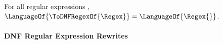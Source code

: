 \documentclass[sigplan,acmsmall]{acmart}
\begin{document}
\begin{theorem}
  \label{thm:dnfrs}
  For all regular expressions \Regex{},
  $\LanguageOf{\ToDNFRegexOf{\Regex}}=\LanguageOf{\Regex{}}$.
\end{theorem}




\paragraph*{DNF Regular Expression Rewrites}
\end{document}
